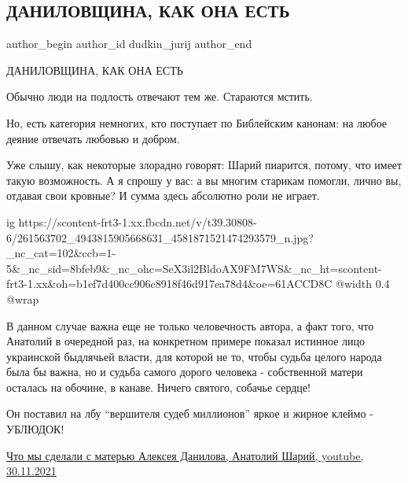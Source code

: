  
 
 
 
 
 
\subsection{ДАНИЛОВЩИНА, КАК ОНА ЕСТЬ}
\label{sec:30_11_2021.fb.dudkin_jurij.1.danilovschina}
 
\ifcmt
 author_begin
   author_id dudkin_jurij
 author_end
\fi

ДАНИЛОВЩИНА, КАК ОНА ЕСТЬ

Обычно люди на подлость отвечают тем же. Стараются мстить.

Но, есть категория немногих, кто поступает по Библейским канонам: на любое
деяние отвечать любовью и добром.

Уже слышу, как некоторые злорадно говорят: Шарий пиарится, потому, что имеет
такую возможность. А я спрошу у вас: а вы многим старикам помогли, лично вы,
отдавая свои кровные? И сумма здесь абсолютно роли не играет.

\ifcmt
  ig https://scontent-frt3-1.xx.fbcdn.net/v/t39.30808-6/261563702_4943815905668631_4581871521474293579_n.jpg?_nc_cat=102&ccb=1-5&_nc_sid=8bfeb9&_nc_ohc=SeX3il2BldoAX9FM7WS&_nc_ht=scontent-frt3-1.xx&oh=b1ef7d400cc906c8918f46d917ea78d4&oe=61ACCD8C
  @width 0.4
  @wrap 
\fi

В данном случае важна еще не только человечность автора, а факт того, что
Анатолий в очередной раз, на конкретном примере показал истинное лицо
украинской быдлячьей власти, для которой не то, чтобы судьба целого народа была
бы важна, но и судьба самого дорого человека - собственной матери осталась на
обочине, в канаве. Ничего святого, собачье сердце!

Он поставил на лбу \enquote{вершителя судеб миллионов} яркое и жирное клеймо -
УБЛЮДОК!

\href{https://youtu.be/wSJLgJM7REM}{%
Что мы сделали с матерью Алексея Данилова, Анатолий Шарий, youtube, 30.11.2021%
}

